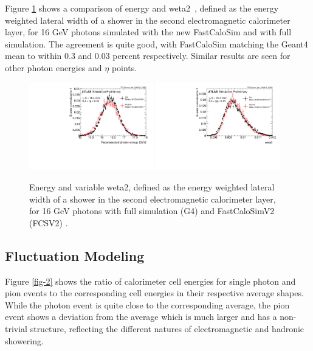 Figure \ref{fig-1} shows a comparison of energy and weta2~\cite{ATLAS-CONF-2010-077}, defined as the energy weighted lateral width of a 
shower in the second electromagnetic calorimeter layer, for 16 GeV photons simulated with the new FastCaloSim and with full 
\GEANT simulation. The agreement is quite good, with FastCaloSim matching the Geant4 mean to within 0.3 and 0.03 percent 
respectively. Similar results are seen for other photon energies and $\eta$ points.
\begin{figure}[ht!]
\centering
\includegraphics[width=0.48\textwidth]{figures/CHEP-photon-energy.pdf}
\includegraphics[width=0.48\textwidth]{figures/CHEP-photon-weta2.pdf}
\caption{Energy and variable weta2, defined as the energy weighted lateral width of a shower in the second electromagnetic calorimeter layer, for 16 GeV photons with full simulation (G4) and FastCaloSimV2 (FCSV2) \cite{ATL-SOFT-PUB-2018-002}.}
\label{fig-1} 
\end{figure}

\FloatBarrier
\subsection{Fluctuation Modeling}
\label{fluct-modeling}
Figure \ref{fig-2} shows the ratio of calorimeter cell energies for single \GEANT photon and pion events to the corresponding 
cell energies in their respective average shapes. While the photon event is quite close to the corresponding average, the 
pion event shows a deviation from the average which is much larger and has a non-trivial structure, reflecting the different 
natures of electromagnetic and hadronic showering.

